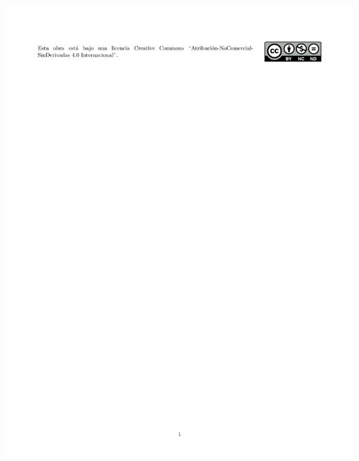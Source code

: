 \documentclass[10pt,twoside]{rcmart} %
\begin{document}
% 

% 



\begingroup
	\let\clearpage\relax 
	\onecolumn 
	\begin{center}
		\includegraphics[scale=0.93]{Licencia.pdf}
	\end{center}
\endgroup
\end{document}
